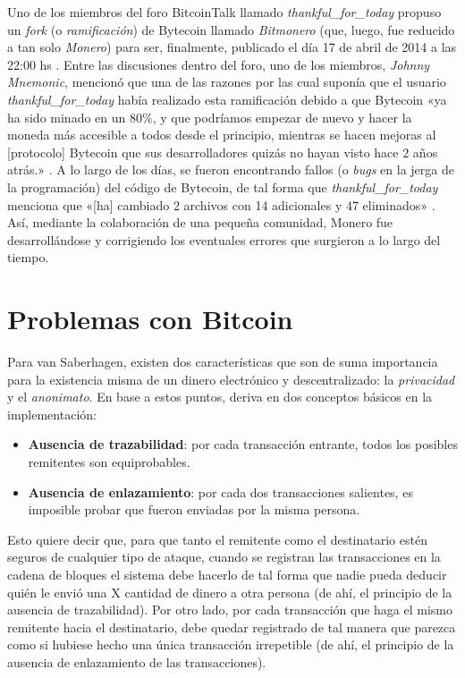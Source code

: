 \documentclass[12pt,a4paper,twoside]{book}
\begin{document}
Uno de los miembros del foro BitcoinTalk llamado \textit{thankful\_for\_today} propuso un \textit{fork} (o \textit{ramificación}) de Bytecoin llamado \textit{Bitmonero} (que, luego, fue reducido a tan solo \textit{Monero}) para ser, finalmente, publicado el día 17 de abril de 2014 a las 22:00 hs \cite[\# 37]{monero:cryptonote}. Entre las discusiones dentro del foro, uno de los miembros, \textit{Johnny Mnemonic}, mencionó que una de las razones por las cual suponía que el usuario \textit{thankful\_for\_today} había realizado esta ramificación debido a que Bytecoin «ya ha sido minado en un 80\%, y que podríamos empezar de nuevo y hacer la moneda más accesible a todos desde el principio, mientras se hacen mejoras al [protocolo] Bytecoin que sus desarrolladores quizás no hayan visto hace 2 años atrás.» \cite[\# 133]{monero:cryptonote}. A lo largo de los días, se fueron encontrando fallos (o \textit{bugs} en la jerga de la programación) del código de Bytecoin, de tal forma que \textit{thankful\_for\_today} menciona que «[ha] cambiado 2 archivos con 14 adicionales y 47 eliminados» \cite[\# 199]{monero:cryptonote}. Así, mediante la colaboración de una pequeña comunidad, Monero fue desarrollándose y corrigiendo los eventuales errores que surgieron a lo largo del tiempo.

\section{Problemas con Bitcoin}
Para van Saberhagen, existen dos características que son de suma importancia para la existencia misma de un dinero electrónico y descentralizado: la \textit{privacidad} y el \textit{anonimato}. En base a estos puntos, deriva en dos conceptos básicos en la implementación:

\begin{itemize}
\item \textbf{Ausencia de trazabilidad}: por cada transacción entrante, todos los posibles remitentes son equiprobables.
\item \textbf{Ausencia de enlazamiento}: por cada dos transacciones salientes, es imposible probar que fueron enviadas por la misma persona.
\end{itemize}

Esto quiere decir que, para que tanto el remitente como el destinatario estén seguros de cualquier tipo de ataque, cuando se registran las transacciones en la cadena de bloques el sistema debe hacerlo de tal forma que nadie pueda deducir quién le envió una X cantidad de dinero a otra persona (de ahí, el principio de la ausencia de trazabilidad). Por otro lado, por cada transacción que haga el mismo remitente hacia el destinatario, debe quedar registrado de tal manera que parezca como si hubiese hecho una única transacción irrepetible (de ahí, el principio de la ausencia de enlazamiento de las transacciones).
\end{document}
